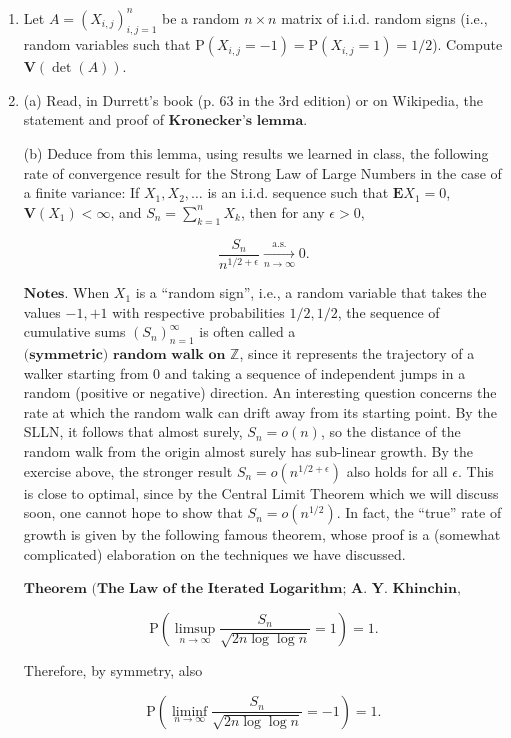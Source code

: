 \documentclass[11pt]{report}
\theoremstyle{plain}
\theoremstyle{definition}
\begin{document}
\begin{enumerate}[label=\arabic*.]
\[
\mathrm{P}\left( \limsup_{n\to\infty} \frac{X_n}{\log n} = 1\right) = 1.
\]

\item Let $A=(X_{i,j})_{i,j=1}^n$ be a random $n\times n$
matrix of i.i.d. random signs (i.e., random variables
such that
$\mathrm{P}(X_{i,j}=-1) = \mathrm{P}(X_{i,j}=1)=1/2$).
Compute $\mathbf{V}(\det(A))$.

\item (a) Read, in Durrett's book (p. 63 in the 3rd
edition) or on Wikipedia, the statement and proof of
$\textbf{Kronecker's lemma}$.

(b) Deduce from this lemma, using results we learned
in class, the following rate of convergence result for
the Strong Law of Large Numbers in the case of a
finite variance: If $X_1, X_2, \ldots$ is an i.i.d.
sequence such that $\mathbf{E} X_1 = 0$,
$\mathbf{V}(X_1)<\infty$, and $S_n=\sum_{k=1}^n X_k$,
then for any $\epsilon>0$,

\[
\frac{S_n}{n^{1/2+\epsilon}} \xrightarrow[n\to\infty]{\textrm{a.s.}} 0.
\]

\noindent $\textbf{Notes.}$ When $X_1$ is a ``random sign'',
i.e., a random variable that takes the values $-1,+1$
with respective probabilities $1/2,1/2$, the sequence
of cumulative sums $(S_n)_{n=1}^\infty$ is often
called a
$\textbf{(symmetric) random walk on } \mathbb{Z}$,
since it represents the trajectory of a walker
starting from 0 and taking a sequence of independent
jumps in a random (positive or negative) direction. An
interesting question concerns the rate at which the
random walk can drift away from its starting point. By
the SLLN, it follows that almost surely, $S_n = o(n)$,
so the distance of the random walk from the origin
almost surely has sub-linear growth. By the exercise
above, the stronger result $S_n = o(n^{1/2+\epsilon})$
also holds for all $\epsilon$. This is close to
optimal, since by the Central Limit Theorem which we
will discuss soon, one cannot hope to show that
$S_n = o(n^{1/2})$. In fact, the ``true'' rate of
growth is given by the following famous theorem, whose
proof is a (somewhat complicated) elaboration on the
techniques we have discussed.

$\textbf{Theorem (The Law of the Iterated Logarithm;
A. Y. Khinchin, 1924).}$

\[
\mathrm{P}\left(\limsup_{n\to\infty} \frac{S_n}{\sqrt{2n \log\log n}} = 1\right) = 1.
\]

\noindent Therefore, by symmetry, also

\[
\mathrm{P}\left(\liminf_{n\to\infty} \frac{S_n}{\sqrt{2n \log\log n}} = -1\right) = 1.
\]


\end{enumerate}
\end{document}

